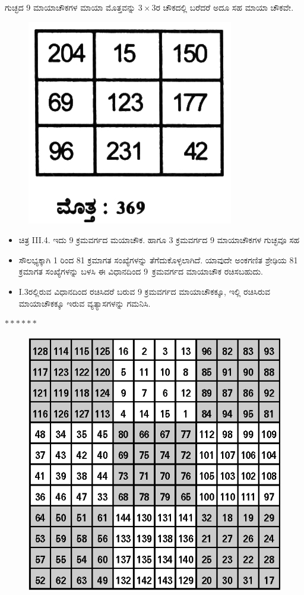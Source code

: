 ಗುಚ್ಛದ 9 ಮಾಯಾಚೌಕಗಳ ಮಾಯಾ ಮೊತ್ತವನ್ನು $3 \times 3$ರ ಚೌಕದಲ್ಲಿ ಬರೆದರೆ ಅದೂ ಸಹ ಮಾಯಾ ಚೌಕವೇ.
\begin{figure}[H]
\includegraphics{src/figures/chap3/fig3-32.jpg}
\end{figure}

\begin{itemize}
	\item ಚಿತ್ರ  III.4. ಇದು 9 ಕ್ರಮವರ್ಗದ ಮಯಾಚೌಕ. ಹಾಗೂ 3 ಕ್ರಮವರ್ಗದ 9 ಮಾಯಾಚೌಕಗಳ ಗುಚ್ಛವೂ ಸಹ
	\item ಸೌಲಭ್ಯಕ್ಕಾಗಿ 1 ರಿಂದ 81 ಕ್ರಮಾಗತ ಸಂಖ್ಯೆಗಳನ್ನು ತೆಗೆದುಕೊಳ್ಳಲಾಗಿದೆ. \hbox{ಯಾವುದೇ} ಅಂಕಗಣಿತ ಶ್ರೇಢಿಯ 81 ಕ್ರಮಾಗತ ಸಂಖ್ಯೆಗಳನ್ನು ಬಳಸಿ ಈ ವಿಧಾನದಿಂದ \hbox{9 ಕ್ರಮವರ್ಗದ} ಮಾಯಾಚೌಕ ರಚಿಸಬಹುದು.
	\item I.3ರಲ್ಲಿರುವ ವಿಧಾನದಿಂದ ರಚಿಸಿದರೆ ಬರುವ 9 ಕ್ರಮವರ್ಗದ ಮಾಯಾಚೌಕಕ್ಕೂ, ಇಲ್ಲಿ ರಚಿಸಿರುವ ಮಾಯಾಚೌಕಕ್ಕೂ ಇರುವ ವ್ಯತ್ಯಾಸಗಳನ್ನು ಗಮನಿಸಿ.
\end{itemize}

\begin{center}
$******$
\end{center}

\begin{figure}[H]
\includegraphics[scale=1.15]{src/figures/chap3/fig3-33.eps}
\end{figure}

